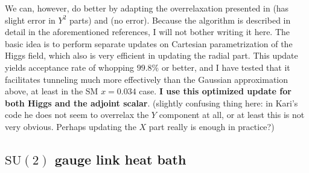 \documentclass[11pt,a4paper]{article}
\newcommand\gr[1]{\mathrm{#1}}%
\newcommand\lauri[1]{{\color{myorange}#1}}
\begin{document}
We can, however, do better by adapting the overrelaxation presented in \cite{Kajantie:1995kf} (has slight error in $Y^2$ parts) and \cite{Laine:1998qk} (no error). Because the algorithm is described in detail in the aforementioned references, I will not bother writing it here. The basic idea is to perform separate updates on Cartesian parametrization of the Higgs field, which also is very efficient in updating the radial part. This update yields acceptance rate of whopping $99.8\%$ or better, and I have tested that it facilitates tunneling much more effectively than the Gaussian approximation above, at least in the SM $x = 0.034$ case. \textbf{I use this optimized update for both Higgs and the adjoint scalar}. \lauri{(slightly confusing thing here: in Kari's code he does not seem to overrelax the $Y$ component at all, or at least this is not very obvious. Perhaps updating the $X$ part really is enough in practice?)}

\subsection{$\gr{SU(2)}$ gauge link heat bath}
\end{document}
